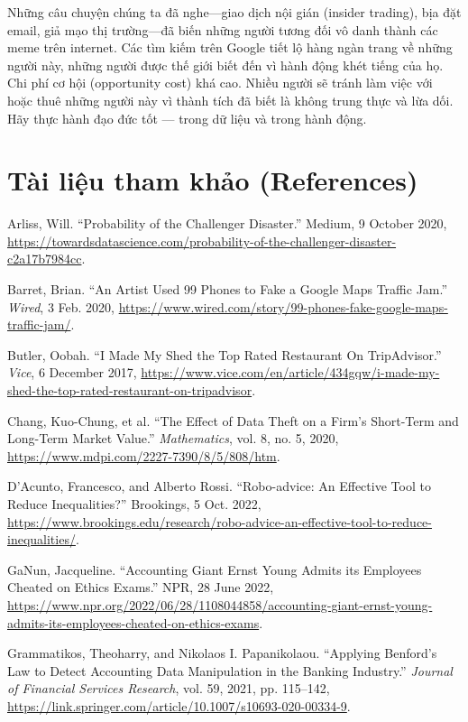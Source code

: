 Những câu chuyện chúng ta đã nghe---giao dịch nội gián (insider trading), bịa đặt email, giả mạo thị trường---đã biến những người tương đối vô danh thành các meme trên internet. Các tìm kiếm trên Google tiết lộ hàng ngàn trang về những người này, những người được thế giới biết đến vì hành động khét tiếng của họ. Chi phí cơ hội (opportunity cost) khá cao. Nhiều người sẽ tránh làm việc với hoặc thuê những người này vì thành tích đã biết là không trung thực và lừa dối. Hãy thực hành đạo đức tốt --- trong dữ liệu và trong hành động.

\section{Tài liệu tham khảo (References)}

Arliss, Will. ``Probability of the Challenger Disaster.'' Medium, 9 October 2020, \url{https://towardsdatascience.com/probability-of-the-challenger-disaster-c2a17b7984cc}.

Barret, Brian. ``An Artist Used 99 Phones to Fake a Google Maps Traffic Jam.'' \emph{Wired}, 3 Feb. 2020, \url{https://www.wired.com/story/99-phones-fake-google-maps-traffic-jam/}.

Butler, Oobah. ``I Made My Shed the Top Rated Restaurant On TripAdvisor.'' \emph{Vice}, 6 December 2017, \url{https://www.vice.com/en/article/434gqw/i-made-my-shed-the-top-rated-restaurant-on-tripadvisor}.

Chang, Kuo-Chung, et al. ``The Effect of Data Theft on a Firm's Short-Term and Long-Term Market Value.'' \emph{Mathematics}, vol. 8, no. 5, 2020, \url{https://www.mdpi.com/2227-7390/8/5/808/htm}.

D'Acunto, Francesco, and Alberto Rossi. ``Robo-advice: An Effective Tool to Reduce Inequalities?'' Brookings, 5 Oct. 2022, \url{https://www.brookings.edu/research/robo-advice-an-effective-tool-to-reduce-inequalities/}.

GaNun, Jacqueline. ``Accounting Giant Ernst Young Admits its Employees Cheated on Ethics Exams.'' NPR, 28 June 2022, \url{https://www.npr.org/2022/06/28/1108044858/accounting-giant-ernst-young-admits-its-employees-cheated-on-ethics-exams}.

Grammatikos, Theoharry, and Nikolaos I. Papanikolaou. ``Applying Benford's Law to Detect Accounting Data Manipulation in the Banking Industry.'' \emph{Journal of Financial Services Research}, vol. 59, 2021, pp. 115--142, \url{https://link.springer.com/article/10.1007/s10693-020-00334-9}.

